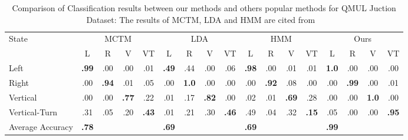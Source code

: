 \begin{table}[!htbp]
		\begin{center}
			\renewcommand\arraystretch{1.5}
			\setlength{\tabcolsep}{7pt}
			\begin{tabular}{l | c c c c | c c c c | c c c c | c c c c}
				\toprule[1pt] 
				\multirow{2}{*}{State}		&\multicolumn{4}{c|}{MCTM}	&\multicolumn{4}{c|}{LDA}	&\multicolumn{4}{c|}{HMM}		&\multicolumn{4}{c}{Ours}\\
				\cmidrule{2-5}		\cmidrule{6-9}		\cmidrule{10-13}	\cmidrule{14-17}
				&L	&R	&V	&VT	&L	&R	&V	&VT	&L	&R	&V	&VT	&L	&R	&V	&VT\\
				\midrule[1pt]
				Left	&\textbf{.99}	&.00	&.00	&.01	&\textbf{.49}	&.44	&.00	&.06	&\textbf{.98}	&.00	&.01	&.01	
				
				&\textbf{1.0}	&.00	&.00	&.00\\
				
				Right	&.00	&\textbf{.94}	&.01	&.05	&.00	&\textbf{1.0}	&.00	&.00	&.00	&\textbf{.92}	&.08	&.00	
				
				&.00	&\textbf{.99}	&.00	&.01\\
				
				Vertical	&.00	&.00	&\textbf{.77}	&.22	&.01	&.17	&\textbf{.82}	&.00	&.02	&.01	&\textbf{.69}	&.28	
				
				&.00	&.00	&\textbf{1.0}	&.00\\
				
				Vertical-Turn	&.31	&.05	&.20	&\textbf{.43}	&.01	&.21	&.30	&\textbf{.46}	&.49	&.04	&.32	&\textbf{.15}	
				
				&.05	&.00	&.00	&\textbf{.95}\\
				\cmidrule{1-17}	
				Average Accuracy		&\textbf{.78}	&	&	&	&\textbf{.69}	&	&	&	&\textbf{.69}	&	&	&	
				
				&\textbf{.99}	&	&	&\\	%
				
				\bottomrule[1pt] 
				
			\end{tabular}
		\end{center}
		\caption[Comparison of Classification results between our methods and others popular methods for QMUL Juction Dataset]
		{Comparison of Classification results between our methods and others popular methods for QMUL Juction Dataset: The results of MCTM, LDA and HMM are cited from ~\cite{hospedales2012video}}
		\label{tab:qmul_compare} 
\end{table}

